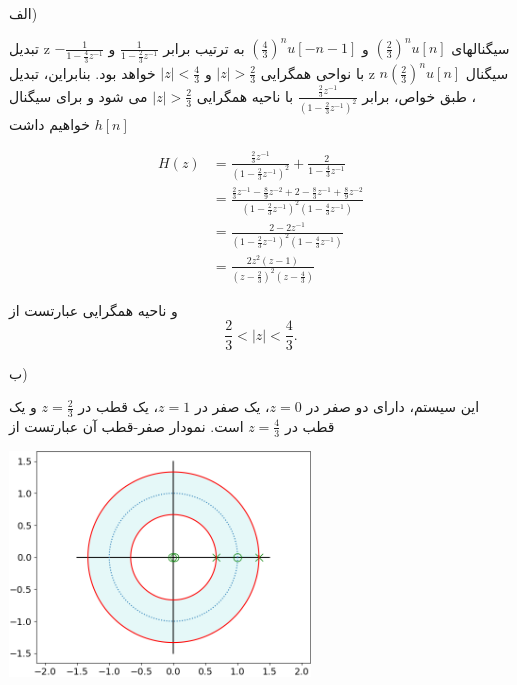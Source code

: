 \documentclass{article}
\newcommand{\qn}[1]{
\[
\begin{split}
#1
\end{split}
\]
}
\begin{document}
%

\large

الف)

تبدیل z سیگنالهای 
$
(\frac{2}{3})^nu[n]
$
و
$
(\frac{4}{3})^nu[-n-1]
$
به ترتیب برابر 
$
\frac{1}{1-\frac{2}{3}z^{-1}}
$
و
$
-\frac{1}{1-\frac{4}{3}z^{-1}}
$
با نواحی همگرایی 
$
|z|>\frac{2}{3}
$
و
$
|z|<\frac{4}{3}
$
خواهد بود. بنابراین، تبدیل z سیگنال 
$
n(\frac{2}{3})^nu[n]
$
، طبق خواص، برابر 
$
\frac{\frac{2}{3}z^{-1}}{(1-\frac{2}{3}z^{-1})^2}
$
با ناحیه همگرایی 
$
|z|>\frac{2}{3}
$
می شود و برای سیگنال 
$
h[n]
$
خواهیم داشت
\qn{
H(z)&=
\frac{\frac{2}{3}z^{-1}}{(1-\frac{2}{3}z^{-1})^2}
+
\frac{2}{1-\frac{4}{3}z^{-1}}
\\&=
\frac{
\frac{2}{3}z^{-1}-\frac{8}{9}z^{-2}+2-\frac{8}{3}z^{-1}+\frac{8}{9}z^{-2}
}{(1-\frac{2}{3}z^{-1})^2(1-\frac{4}{3}z^{-1})}
\\&=
\frac{
2-2z^{-1}
}{(1-\frac{2}{3}z^{-1})^2(1-\frac{4}{3}z^{-1})}
\\&=
\frac{
2z^2(z-1)
}{(z-\frac{2}{3})^2(z-\frac{4}{3})}
}
و ناحیه همگرایی عبارتست از
$$
\frac{2}{3}<|z|<\frac{4}{3}.
$$

ب)

این سیستم، دارای دو صفر در $z=0$، یک صفر در $z=1$، یک قطب در 
$
z=\frac{2}{3}
$
و یک قطب در 
$
z=\frac{4}{3}
$
است. نمودار صفر-قطب آن عبارتست از

{
\begin{center}
\includegraphics[width=80mm]{pz.png}
\end{center}
}
\end{document}
